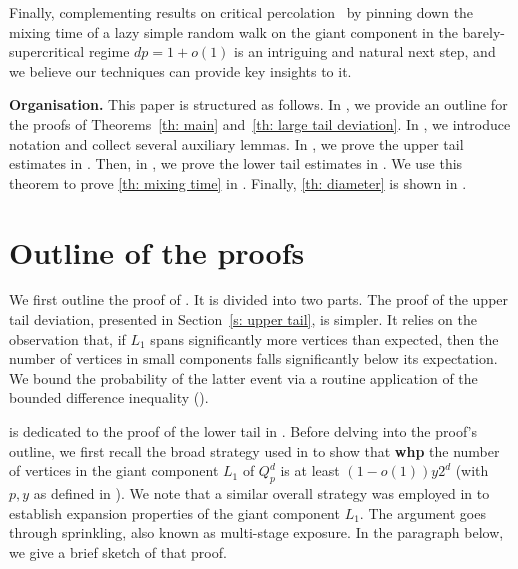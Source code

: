\documentclass[reqno,final,a4paper]{amsart}
\theoremstyle{definition}
\newcommand{\1}{\mathbbm{1}}
\begin{document}
Finally, complementing results on critical percolation~\cite{B-RBN24,BCVSS06,DKLP11,HS04,HN20} by pinning down the mixing time of a lazy simple random walk on the giant component in the barely-supercritical regime $dp=1+o(1)$ is an intriguing and natural next step, and we believe our techniques can provide key insights to it.

\vspace{1em}

\noindent
\textbf{Organisation.} This paper is structured as follows. In , we provide an outline for the proofs of Theorems~\ref{th: main} and~\ref{th: large tail deviation}. 
In , we introduce notation and collect several auxiliary lemmas. 
In , we prove the upper tail estimates in . 
Then, in , we prove the lower tail estimates in . 
We use this theorem to prove \ref{th: mixing time} in . Finally, \ref{th: diameter} is shown in .

\section{Outline of the proofs}\label{s: outline}
We first outline the proof of . 
It is divided into two parts. The proof of the upper tail deviation, presented in Section~\ref{s: upper tail}, is simpler. 
It relies on the observation that, if $L_1$ spans significantly more vertices than expected, then the number of vertices in small components falls significantly below its expectation. 
We bound the probability of the latter event via a routine application of the bounded difference inequality (). 

 is dedicated to the proof of the lower tail in . 
Before delving into the proof's outline, we first recall the broad strategy used in \cite{AKS81, BKL92, K23} to show that \textbf{whp} the number of vertices in the giant component $L_1$ of $Q^d_p$ is at least $(1-o(1))y2^d$ (with $p,y$ as defined in ). We note that a similar overall strategy was employed in \cite{DEKK24, EKK22} to establish expansion properties of the giant component $L_1$. The argument goes through sprinkling, also known as multi-stage exposure. In the paragraph below, we give a brief sketch of that proof.
\end{document}

